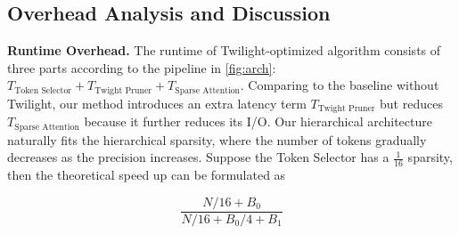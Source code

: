 

\subsection{Overhead Analysis and Discussion\label{sec:disc}}

\textbf{Runtime Overhead.} The runtime of Twilight-optimized algorithm consists of three parts according to the pipeline in \autoref{fig:arch}: $T_{\text{Token Selector}} + T_{\text{Twight Pruner}} + T_{\text{Sparse Attention}}$. Comparing to the baseline without Twilight, our method introduces an extra latency term $T_{\text{Twight Pruner}}$ but reduces $T_{\text{Sparse Attention}}$ because it further reduces its I/O. Our hierarchical architecture naturally fits the hierarchical sparsity, where the number of tokens gradually decreases as the precision increases. Suppose the Token Selector has a $\frac{1}{16}$ sparsity, then the theoretical speed up can be formulated as 

$$
    \frac{N/16 + B_0}{N/16 + B_0/4 + B_1}
$$

